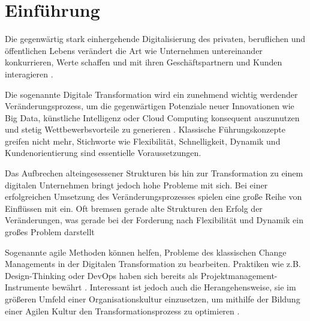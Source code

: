 \chapter{Einführung}
\label{introduction}

Die gegenwärtig stark einhergehende Digitalisierung des privaten, beruflichen und öffentlichen Lebens verändert die Art wie Unternehmen untereinander konkurrieren, Werte schaffen und mit ihren Geschäftspartnern und Kunden interagieren \cite[S. 1]{oswald_digitale_2018}.

Die sogenannte Digitale Transformation wird ein zunehmend wichtig werdender Veränderungsprozess, um die gegenwärtigen Potenziale neuer Innovationen wie Big Data, künstliche Intelligenz oder Cloud Computing konsequent auszunutzen und stetig Wettbewerbsvorteile zu generieren \cite[S. 2]{oswald_digitale_2018}. Klassische Führungskonzepte greifen nicht mehr, Stichworte wie Flexibilität, Schnelligkeit, Dynamik und Kundenorientierung sind essentielle Voraussetzungen. 

Das Aufbrechen alteingesessener Strukturen bis hin zur Transformation zu einem digitalen Unternehmen bringt jedoch hohe Probleme mit sich. Bei einer erfolgreichen Umsetzung des Veränderungsprozesses spielen eine große Reihe von Einflüssen mit ein. Oft bremsen gerade alte Strukturen den Erfolg der Veränderungen, was gerade bei der Forderung nach Flexibilität und Dynamik ein großes Problem darstellt
\cite[S. 196]{appelfeller_digitale_2018}


Sogenannte agile Methoden können helfen, Probleme des klassischen Change Managements in der Digitalen Transformation zu bearbeiten. Praktiken wie z.B. Design-Thinking oder DevOps haben sich bereits als Projektmanagement-Instrumente bewährt \cite[S. 7]{deeken_agiles_2018}. Interessant ist jedoch auch die Herangehensweise, sie im größeren Umfeld einer Organisationskultur einzusetzen, um mithilfe der Bildung einer Agilen Kultur den Transformationsprozess zu optimieren \cite[S. 140]{hofert_agiler_2016}.

